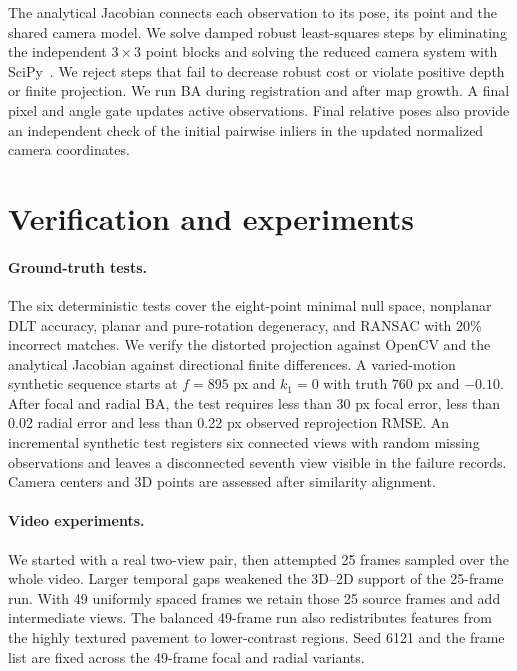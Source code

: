 \documentclass[11pt,a4paper]{article}
\begin{document}
The analytical Jacobian connects each observation to its pose, its point
and the shared camera model. We solve damped robust least-squares steps by
eliminating the independent \(3\times3\) point blocks and solving the
reduced camera system with SciPy~\cite{triggs2000bundle}. We reject
steps that fail to decrease robust cost or violate positive depth or
finite projection. We run BA during registration and after map growth.
A final pixel and angle gate updates active observations. Final relative
poses also provide an independent check of the initial pairwise inliers in
the updated normalized camera coordinates.

\section{Verification and experiments}

\paragraph{Ground-truth tests.}
The six deterministic tests cover the eight-point minimal null space,
nonplanar DLT accuracy, planar and pure-rotation degeneracy, and RANSAC
with 20\% incorrect matches. We verify the distorted projection against
OpenCV and the analytical Jacobian against directional finite differences.
A varied-motion synthetic sequence starts at \(f=895\) px and \(k_1=0\)
with truth \(760\) px and \(-0.10\). After focal and radial BA, the test
requires less than 30 px focal error, less than 0.02 radial error and less
than 0.22 px observed reprojection RMSE. An incremental synthetic test
registers six connected views with random missing observations and leaves
a disconnected seventh view visible in the failure records. Camera
centers and 3D points are assessed after similarity alignment.

\paragraph{Video experiments.}
We started with a real two-view pair, then attempted 25 frames sampled
over the whole video. Larger temporal gaps weakened the 3D--2D support
of the 25-frame run. With 49 uniformly spaced frames we retain those 25
source frames and add intermediate views. The balanced 49-frame run
also redistributes features from the highly textured pavement to
lower-contrast regions. Seed 6121 and the frame list are fixed across the
49-frame focal and radial variants.
\end{document}
